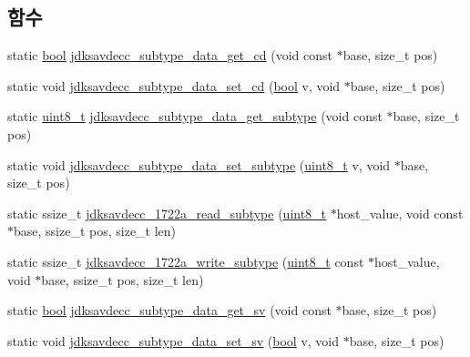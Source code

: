 \subsection*{함수}
\begin{DoxyCompactItemize}
\item 
static \hyperlink{avb__gptp_8h_af6a258d8f3ee5206d682d799316314b1}{bool} \hyperlink{group__jdksavdecc__subtype__data_gaf5db5e527db7fc0c8af94b6067c527b5}{jdksavdecc\+\_\+subtype\+\_\+data\+\_\+get\+\_\+cd} (void const $\ast$base, size\+\_\+t pos)
\item 
static void \hyperlink{group__jdksavdecc__subtype__data_gaecae3412f9f6d5fe12cc64f97fbe976c}{jdksavdecc\+\_\+subtype\+\_\+data\+\_\+set\+\_\+cd} (\hyperlink{avb__gptp_8h_af6a258d8f3ee5206d682d799316314b1}{bool} v, void $\ast$base, size\+\_\+t pos)
\item 
static \hyperlink{stdint_8h_aba7bc1797add20fe3efdf37ced1182c5}{uint8\+\_\+t} \hyperlink{group__jdksavdecc__subtype__data_gae2499776e9b3b9756d3c738fab70d10b}{jdksavdecc\+\_\+subtype\+\_\+data\+\_\+get\+\_\+subtype} (void const $\ast$base, size\+\_\+t pos)
\item 
static void \hyperlink{group__jdksavdecc__subtype__data_gace07e079c70f5ddc6523f5ad916ff8a3}{jdksavdecc\+\_\+subtype\+\_\+data\+\_\+set\+\_\+subtype} (\hyperlink{stdint_8h_aba7bc1797add20fe3efdf37ced1182c5}{uint8\+\_\+t} v, void $\ast$base, size\+\_\+t pos)
\item 
static ssize\+\_\+t \hyperlink{group__jdksavdecc__subtype__data_gaaf93939d58178b6f6f5dc514a8cc3592}{jdksavdecc\+\_\+1722a\+\_\+read\+\_\+subtype} (\hyperlink{stdint_8h_aba7bc1797add20fe3efdf37ced1182c5}{uint8\+\_\+t} $\ast$host\+\_\+value, void const $\ast$base, ssize\+\_\+t pos, size\+\_\+t len)
\item 
static ssize\+\_\+t \hyperlink{group__jdksavdecc__subtype__data_ga756a5b6d54d3a7b7e8673c89449c0bbc}{jdksavdecc\+\_\+1722a\+\_\+write\+\_\+subtype} (\hyperlink{stdint_8h_aba7bc1797add20fe3efdf37ced1182c5}{uint8\+\_\+t} const $\ast$host\+\_\+value, void $\ast$base, ssize\+\_\+t pos, size\+\_\+t len)
\item 
static \hyperlink{avb__gptp_8h_af6a258d8f3ee5206d682d799316314b1}{bool} \hyperlink{group__jdksavdecc__subtype__data_gaf9cb8fd6301567848c0ab126ab7f562e}{jdksavdecc\+\_\+subtype\+\_\+data\+\_\+get\+\_\+sv} (void const $\ast$base, size\+\_\+t pos)
\item 
static void \hyperlink{group__jdksavdecc__subtype__data_gad48edff3a98cc36614baa2351c6a04b5}{jdksavdecc\+\_\+subtype\+\_\+data\+\_\+set\+\_\+sv} (\hyperlink{avb__gptp_8h_af6a258d8f3ee5206d682d799316314b1}{bool} v, void $\ast$base, size\+\_\+t pos)

\end{DoxyCompactItemize}
